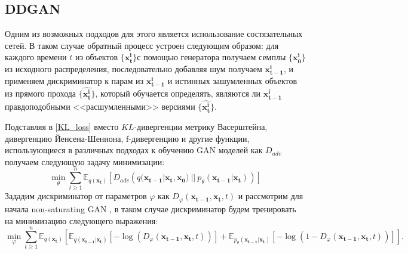 \documentclass{article}
\begin{document}
\subsection{DDGAN}
Одним из возможных подходов для этого является использование состязательных сетей. В таком случае обратный процесс устроен следующим образом: для каждого времени $t$ из объектов $\{\mathbf{x_t^i}\}$с помощью генератора получаем семплы $\{\mathbf{x_0^i}\}$ из исходного распределения, последовательно добавляя шум получаем $\mathbf{x_{t-1}^i}$, и применяем дискриминатор к парам из $\mathbf{x_{t-1}^i}$ и истинных зашумленных объектов из прямого прохода $\{\mathbf{\widehat{x_t^i}}\}$, который обучается определять, являются ли $\mathbf{x_{t-1}^i}$ правдоподобными <<расшумленными>> версиями $\{\mathbf{\widehat{x_t^i}}\}$. 

Подставляя в \ref{KL_loss} вместо $KL$-дивергенции метрику Васерштейна, дивергенцию Йенсена-Шеннона, f-дивергенцию и другие функции, использующиеся в различных подходах к обучению GAN моделей \cite{https://doi.org/10.48550/arxiv.1406.2661, 
		https://doi.org/10.48550/arxiv.1701.07875,
		https://doi.org/10.48550/arxiv.1606.00709,
		https://doi.org/10.48550/arxiv.2010.08029} 
как $D_{adv}$
получаем следующую задачу минимизации:
 \begin{equation}
	\min\limits_\theta\sum\limits_{t\geqslant 1}^n \mathbb{E}_{q(\mathbf{x_t})}[ D_{adv}\left(q(\mathbf{x_{t-1}}|\mathbf{x_t}, \mathbf{x_0})~||~p_\theta(\mathbf{x_{t-1}}|\mathbf{x_t})  \right)]
\end{equation}
Зададим дискриминатор от параметров $\varphi$ как $D_\varphi(\mathbf{x_{t-1}}, \mathbf{x_t}, t)$ и рассмотрим для начала non-saturating GAN \cite{https://doi.org/10.48550/arxiv.1406.2661}, в таком случае дискриминатор будем тренировать на минимизацию следующего выражения:
 \begin{equation}
	\min\limits_\varphi\sum\limits_{t\geqslant 1}^n \mathbb{E}_{q(\mathbf{x_t})}[\mathbb{E}_{q(\mathbf{x_{t-1}}|\mathbf{x_t})}[-\log{ (D_\varphi(\mathbf{x_{t-1}}, \mathbf{x_t}, t) ) }] + \mathbb{E}_{p_\theta(\mathbf{x_{t-1}}|\mathbf{x_t})}[-\log{  (1 - D_\varphi(\mathbf{x_{t-1}}, \mathbf{x_t}, t))  }]].
\end{equation}
\end{document}
